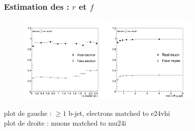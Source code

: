 \begin{frame}
\frametitle{Estimation des  : $r$ et $f$}

\begin{figure}[!htb]
\begin{center}
\includegraphics[width=0.4\textwidth]{Figures/Backgrounds/Eff_el_eta_CR2_realCR1_ge1tag_e24vhi.pdf}
\includegraphics[width=0.4\textwidth]{Figures/Backgrounds/Eff_mu_dR_CR1_realCR1_mu24i.pdf}
\end{center}
\end{figure}

plot de gauche : $\geq 1$ b-jet, electrons matched to e24vhi \\
plot de droite : muons matched to mu24i
\end{frame}


